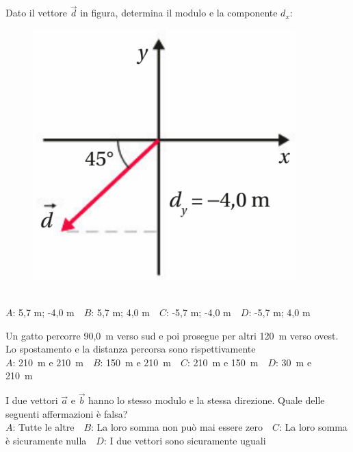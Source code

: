 \mcquestionheader Dato il vettore $\vec{d}$ in figura, determina il modulo e la componente $d_x$: \begin{figure}[h!]   \begin{center}     \includegraphics[scale=0.35]{vettored.png}   \end{center} \end{figure}\\
{$A$}: 5,7 m; -4,0 m\ \ {$B$}: 5,7 m; 4,0 m\ \ {$C$}: -5,7 m; -4,0 m\ \ {$D$}: -5,7 m; 4,0 m\ \ 

\mcquestionfooter



\def\mcquestionnumber{11}


\mcquestionheader Un gatto percorre 90,0~m verso sud e poi prosegue per altri 120~m verso ovest. Lo spostamento e la distanza percorsa sono rispettivamente\\
{$A$}: 210~m e 210~m\ \ {$B$}: 150~m e 210~m\ \ {$C$}: 210~m e 150~m\ \ {$D$}: 30~m e 210~m\ \ 

\mcquestionfooter



\def\mcquestionnumber{12}


\mcquestionheader I due vettori $\vec{a}$ e $\vec{b}$ hanno lo stesso modulo e la stessa direzione. Quale delle seguenti affermazioni è falsa?\\
{$A$}: Tutte le altre\ \ {$B$}: La loro somma non può mai essere zero\ \ {$C$}: La loro somma è sicuramente nulla\ \ {$D$}: I due vettori sono sicuramente uguali\ \ 

\mcquestionfooter



